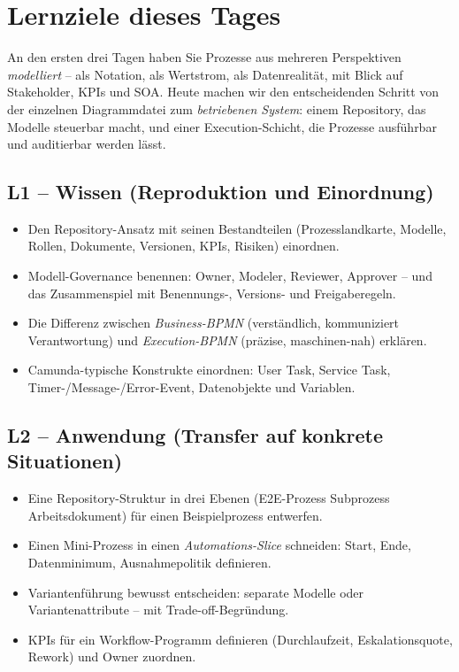 \documentclass[11pt,a4paper,oneside]{article}
\begin{document}
\section*{Lernziele dieses Tages}
\thispagestyle{plain}

\noindent An den ersten drei Tagen haben Sie Prozesse aus mehreren Perspektiven \emph{modelliert} -- als Notation, als Wertstrom, als Datenrealität, mit Blick auf Stakeholder, KPIs und SOA. Heute machen wir den entscheidenden Schritt von der einzelnen Diagrammdatei zum \emph{betriebenen System}: einem Repository, das Modelle steuerbar macht, und einer Execution-Schicht, die Prozesse ausführbar und auditierbar werden lässt.

\subsection*{L1 -- Wissen (Reproduktion und Einordnung)}
\begin{itemize}
  \item Den Repository-Ansatz mit seinen Bestandteilen (Prozesslandkarte, Modelle, Rollen, Dokumente, Versionen, KPIs, Risiken) einordnen.
  \item Modell-Governance benennen: Owner, Modeler, Reviewer, Approver -- und das Zusammenspiel mit Benennungs-, Versions- und Freigaberegeln.
  \item Die Differenz zwischen \emph{Business-BPMN} (verständlich, kommuniziert Verantwortung) und \emph{Execution-BPMN} (präzise, maschinen-nah) erklären.
  \item Camunda-typische Konstrukte einordnen: User Task, Service Task, Timer-/Message-/Error-Event, Datenobjekte und Variablen.
\end{itemize}

\subsection*{L2 -- Anwendung (Transfer auf konkrete Situationen)}
\begin{itemize}
  \item Eine Repository-Struktur in drei Ebenen (E2E-Prozess \textrightarrow{} Subprozess \textrightarrow{} Arbeitsdokument) für einen Beispielprozess entwerfen.
  \item Einen Mini-Prozess in einen \emph{Automations-Slice} schneiden: Start, Ende, Datenminimum, Ausnahmepolitik definieren.
  \item Variantenführung bewusst entscheiden: separate Modelle oder Variantenattribute -- mit Trade-off-Begründung.
  \item KPIs für ein Workflow-Programm definieren (Durchlaufzeit, Eskalationsquote, Rework) und Owner zuordnen.
\end{itemize}
\end{document}
